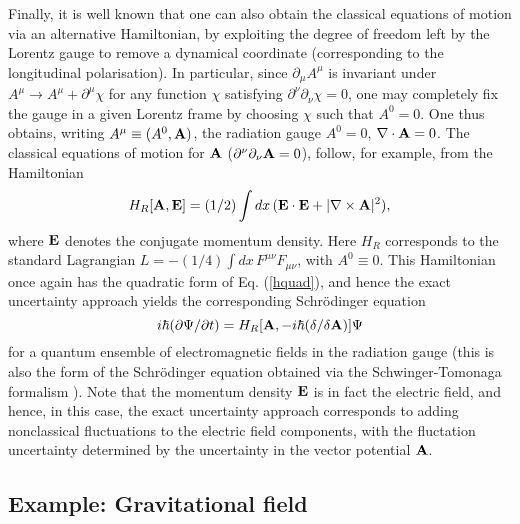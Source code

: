 \documentclass[a4paper,preprint, showpacs, aps, draft]{revtex4}
\begin{document}
{Finally, it is well known that one  can 
also obtain the classical equations of motion via an
alternative Hamiltonian, by exploiting the degree of freedom left by the
Lorentz gauge to remove a dynamical 
coordinate (corresponding to the longitudinal polarisation).  In
particular, since $\partial_\mu A^\mu$ is invariant under 
$A^\mu\rightarrow A^\mu +\partial^\mu \chi$ for any function $\chi$
satisfying $\partial^\nu\partial_\nu\chi=0$, one may completely
fix the gauge in a given Lorentz frame by choosing $\chi$ such that
$A^0=0$.  One thus obtains, writing $A^\mu\equiv(A^0,{\bf A})$, the
radiation gauge $A^0=0$, $\nabla\cdot{\bf A}=0$.  The classical
equations of motion for
${\bf A}$ ($\partial^\nu\partial_\nu{\bf A}=0$), follow, for example,
from the Hamiltonian 
\begin{equation} \label{hc}
H_R[{\bf A},{\bf E}] = (1/2)\int dx\, ({\bf E}\cdot{\bf E} +
|\nabla\times{\bf A}|^2) ,
\end{equation}
where ${\bf E}$ denotes the conjugate momentum density. Here $H_R$
corresponds to the standard Lagrangian $L=-(1/4)\int dx\,F^{\mu\nu}F_{\mu\nu}$,
with  $A^0\equiv 0$.  This Hamiltonian once again has the quadratic
form of Eq. (\ref{hquad}), and hence the exact uncertainty approach 
yields the corresponding Schr\"{o}dinger equation
\begin{equation}
i\hbar(\partial\Psi/\partial t) = H_R[{\bf A},-i\hbar(\delta/\delta {\bf
A})]\Psi
\end{equation} 
for a quantum ensemble of electromagnetic 
fields in the radiation gauge  (this is also
the form of the Schr\"{o}dinger equation obtained via the
Schwinger-Tomonaga formalism \cite{wheeler}).  Note that 
the momentum
density ${\bf E}$ is in fact the electric field, and hence, in this
case, the exact uncertainty approach corresponds to adding nonclassical
fluctuations to the electric field components, with the fluctation uncertainty
determined by the uncertainty in the vector potential ${\bf A}$.

\subsection{Example: Gravitational field}

}
\end{document}
